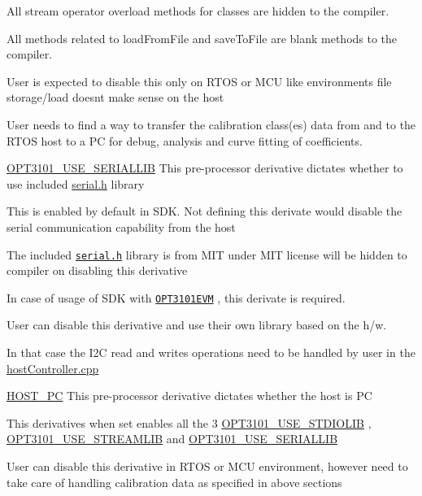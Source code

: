 \begin{DoxyItemize}
\begin{DoxyItemize}
\item All stream operator overload methods for classes are hidden to the compiler.
\item All methods related to load\+From\+File and save\+To\+File are blank methods to the compiler.
\item User is expected to disable this only on R\+T\+OS or M\+CU like environments file storage/load doesn\textquotesingle{}t make sense on the host
\item User needs to find a way to transfer the calibration class(es) data from and to the R\+T\+OS host to a PC for debug, analysis and curve fitting of coefficients.
\end{DoxyItemize}
\item \mbox{\hyperlink{host_controller_8h_af9ad545b8deb1b3c44ff9168213be470}{O\+P\+T3101\+\_\+\+U\+S\+E\+\_\+\+S\+E\+R\+I\+A\+L\+L\+IB}} This pre-\/processor derivative dictates whether to use included \mbox{\hyperlink{serial_8h}{serial.\+h}} library
\begin{DoxyItemize}
\item This is enabled by default in S\+DK. Not defining this derivate would disable the serial communication capability from the host
\item The included \href{https://github.com/wjwwood/serial}{\tt serial.\+h} library is from M\+IT under M\+IT license will be hidden to compiler on disabling this derivative
\item In case of usage of S\+DK with \href{http://www.ti.com/tool/OPT3101EVM}{\tt O\+P\+T3101\+E\+VM} , this derivate is required.
\item User can disable this derivative and use their own library based on the h/w.
\item In that case the I2C read and writes operations need to be handled by user in the \mbox{\hyperlink{host_controller_8cpp}{host\+Controller.\+cpp}}
\end{DoxyItemize}
\item \mbox{\hyperlink{host_controller_8h_a913d77ed1a69aa41135440e6d7e8ec6c}{H\+O\+S\+T\+\_\+\+PC}} This pre-\/processor derivative dictates whether the host is PC
\begin{DoxyItemize}
\item This derivatives when set enables all the 3 \mbox{\hyperlink{host_controller_8h_a140baa610a82653550ea9aa0a85feb43}{O\+P\+T3101\+\_\+\+U\+S\+E\+\_\+\+S\+T\+D\+I\+O\+L\+IB}} , \mbox{\hyperlink{host_controller_8h_a3ca6673b36debd7f489557558d93fe38}{O\+P\+T3101\+\_\+\+U\+S\+E\+\_\+\+S\+T\+R\+E\+A\+M\+L\+IB}} and \mbox{\hyperlink{host_controller_8h_af9ad545b8deb1b3c44ff9168213be470}{O\+P\+T3101\+\_\+\+U\+S\+E\+\_\+\+S\+E\+R\+I\+A\+L\+L\+IB}}
\item User can disable this derivative in R\+T\+OS or M\+CU environment, however need to take care of handling calibration data as specified in above sections
\end{DoxyItemize}
\end{DoxyItemize}





